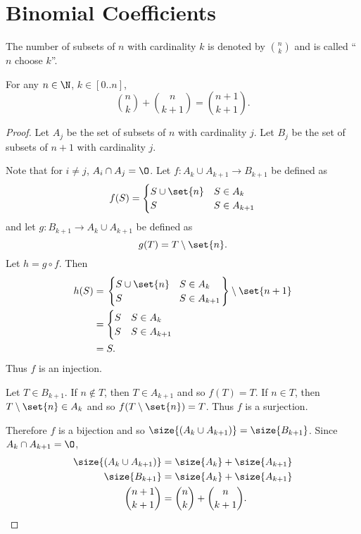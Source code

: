 \section{Binomial Coefficients} \label{sec:binom}
\begin{definition} \label{def:binom:choice}
    The number of subsets of $n$ with cardinality $k$ is denoted by
    $\binom{n}{k}$ and is called ``$n$ choose $k$''.
\end{definition}

\begin{lemma}
    For any $n \in \N$, $k \in [0..n]$, \[
        \binom{n}{k} + \binom{n}{k + 1} = \binom{n + 1}{k + 1}.
    \]
\end{lemma}
\begin{proof}
    Let $A_{j}$ be the set of subsets of $n$ with cardinality $j$.
    Let $B_{j}$ be the set of subsets of $n + 1$ with cardinality $j$.

    Note that for $i \neq j$, $A_{i} \cap A_{j} = \O$.
    Let $f : A_{k} \cup A_{k + 1} \to B_{k + 1}$ be defined as \[
        f(S) = \begin{cases}
            S \cup \set{n} & S \in A_{k} \\
            S & S \in A_{k + 1}
        \end{cases}
    \] and let $g : B_{k + 1} \to A_{k} \cup A_{k + 1}$ be defined as \[
        g(T) = T \setminus \set{n}.
    \]
    Let $h = g \circ f$.
    Then \begin{align*}
        h(S) &= \left. \begin{cases}
            S \cup \set{n} & S \in A_{k} \\
            S & S \in A_{k + 1}
        \end{cases}\right\} \setminus \set{n + 1} \\
        &= \begin{cases}
            S & S \in A_{k} \\
            S & S \in A_{k + 1}
        \end{cases} \\
        &= S.
    \end{align*}
    Thus $f$ is an injection.

    Let $T \in B_{k + 1}$.
    If $n \notin T$, then $T \in A_{k + 1}$ and so $f(T) = T$.
    If $n \in T$, then $T \setminus \set{n} \in A_{k}$ and so
    $f(T \setminus \set{n}) = T$.
    Thus $f$ is a surjection.

    Therefore $f$ is a bijection and so $\size{(A_{k} \cup A_{k + 1})} = \size{B_{k + 1}}$.
    Since $A_{k} \cap A_{k + 1} = \O$,
    \begin{align*}
        \size{(A_{k} \cup A_{k + 1})} &= \size{A_{k}} + \size{A_{k + 1}} \\
        \size{B_{k + 1}} &= \size{A_{k}} + \size{A_{k + 1}} \\
        \binom{n + 1}{k + 1} &= \binom{n}{k} + \binom{n}{k + 1}. \qedhere
    \end{align*}
\end{proof}

